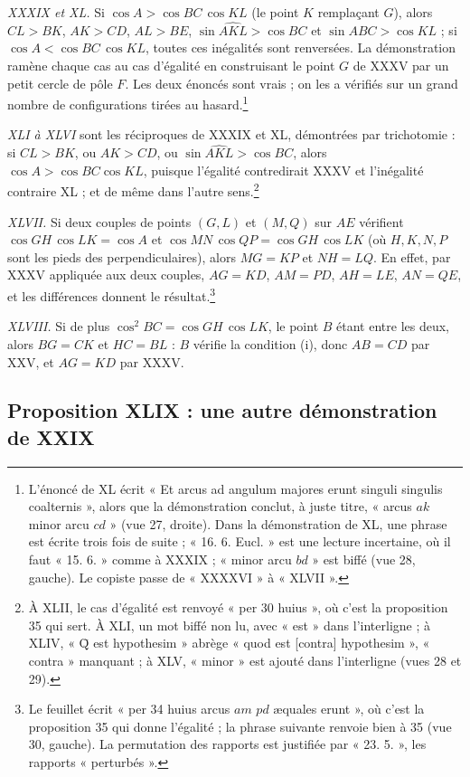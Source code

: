 \documentclass[11pt,a4paper]{article}
\begin{document}
\emph{XXXIX et XL.} Si $\cos A > \cos BC\,\cos KL$ (le point $K$ remplaçant $G$),
alors $CL > BK$, $AK > CD$, $AL > BE$, $\sin\widehat{AKL} > \cos BC$ et
$\sin\widehat{ABC} > \cos KL$ ; si $\cos A < \cos BC\,\cos KL$, toutes ces
inégalités sont renversées. La démonstration ramène chaque cas au cas d'égalité
en construisant le point $G$ de XXXV par un petit cercle de pôle $F$. Les deux
énoncés sont vrais ; on les a vérifiés sur un grand nombre de configurations
tirées au hasard.\footnote{L'énoncé de XL écrit « Et arcus ad angulum majores
erunt singuli singulis coalternis », alors que la démonstration conclut, à juste
titre, « arcus $ak$ minor arcu $cd$ » (vue 27, droite). Dans la démonstration de
XL, une phrase est écrite trois fois de suite ; « 16. 6. Eucl. » est une lecture
incertaine, où il faut « 15. 6. » comme à XXXIX ; « minor arcu $bd$ » est biffé
(vue 28, gauche). Le copiste passe de « XXXXVI » à « XLVII ».}

\emph{XLI à XLVI} sont les réciproques de XXXIX et XL, démontrées par trichotomie :
si $CL > BK$, ou $AK > CD$, ou $\sin\widehat{AKL} > \cos BC$, alors
$\cos A > \cos BC\cos KL$, puisque l'égalité contredirait XXXV et l'inégalité
contraire XL ; et de même dans l'autre sens.\footnote{À XLII, le cas d'égalité est
renvoyé « per 30 huius », où c'est la proposition 35 qui sert. À XLI, un mot biffé
non lu, avec « est » dans l'interligne ; à XLIV, « Q̄ est hypothesim » abrège
« quod est [contra] hypothesim », « contra » manquant ; à XLV, « minor » est ajouté
dans l'interligne (vues 28 et 29).}

\emph{XLVII.} Si deux couples de points $(G, L)$ et $(M, Q)$ sur $AE$ vérifient
$\cos GH\,\cos LK = \cos A$ et $\cos MN\,\cos QP = \cos GH\,\cos LK$ (où $H, K, N, P$
sont les pieds des perpendiculaires), alors $MG = KP$ et $NH = LQ$. En effet, par
XXXV appliquée aux deux couples, $AG = KD$, $AM = PD$, $AH = LE$, $AN = QE$, et
les différences donnent le résultat.\footnote{Le feuillet écrit « per 34 huius
arcus $am$ $pd$ æquales erunt », où c'est la proposition 35 qui donne l'égalité ;
la phrase suivante renvoie bien à 35 (vue 30, gauche). La permutation des rapports
est justifiée par « 23. 5. », les rapports « perturbés ».}

\emph{XLVIII.} Si de plus $\cos^2 BC = \cos GH\,\cos LK$, le point $B$ étant entre
les deux, alors $BG = CK$ et $HC = BL$ : $B$ vérifie la condition (i), donc
$AB = CD$ par XXV, et $AG = KD$ par XXXV.

\subsection*{Proposition XLIX : une autre démonstration de XXIX}
\end{document}
